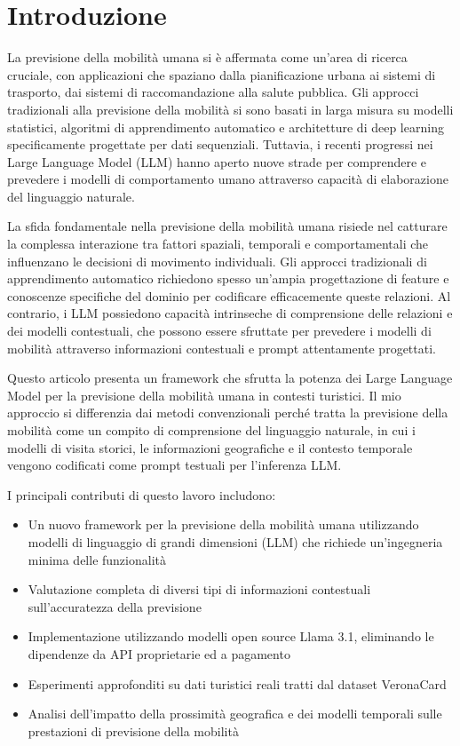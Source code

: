 
\section{Introduzione}
\fancyhead{}

La previsione della mobilità umana si è affermata come un'area di ricerca cruciale, con applicazioni che spaziano dalla pianificazione urbana ai sistemi di trasporto, dai sistemi di raccomandazione alla salute pubblica. Gli approcci tradizionali alla previsione della mobilità si sono basati in larga misura su modelli statistici, algoritmi di apprendimento automatico e architetture di deep learning specificamente progettate per dati sequenziali. Tuttavia, i recenti progressi nei Large Language Model (LLM) hanno aperto nuove strade per comprendere e prevedere i modelli di comportamento umano attraverso capacità di elaborazione del linguaggio naturale.

La sfida fondamentale nella previsione della mobilità umana risiede nel catturare la complessa interazione tra fattori spaziali, temporali e comportamentali che influenzano le decisioni di movimento individuali. Gli approcci tradizionali di apprendimento automatico richiedono spesso un'ampia progettazione di feature e conoscenze specifiche del dominio per codificare efficacemente queste relazioni. Al contrario, i LLM possiedono capacità intrinseche di comprensione delle relazioni e dei modelli contestuali, che possono essere sfruttate per prevedere i modelli di mobilità attraverso informazioni contestuali e prompt attentamente progettati.

Questo articolo presenta un framework che sfrutta la potenza dei Large Language Model per la previsione della mobilità umana in contesti turistici. Il mio approccio si differenzia dai metodi convenzionali perché tratta la previsione della mobilità come un compito di comprensione del linguaggio naturale, in cui i modelli di visita storici, le informazioni geografiche e il contesto temporale vengono codificati come prompt testuali per l'inferenza LLM.

I principali contributi di questo lavoro includono:

\begin{itemize}
\item Un nuovo framework per la previsione della mobilità umana utilizzando modelli di linguaggio di grandi dimensioni (LLM) che richiede un'ingegneria minima delle funzionalità
\item Valutazione completa di diversi tipi di informazioni contestuali sull'accuratezza della previsione
\item Implementazione utilizzando modelli open source Llama 3.1, eliminando le dipendenze da API proprietarie ed a pagamento
\item Esperimenti approfonditi su dati turistici reali tratti dal dataset VeronaCard
\item Analisi dell'impatto della prossimità geografica e dei modelli temporali sulle prestazioni di previsione della mobilità
\end{itemize}